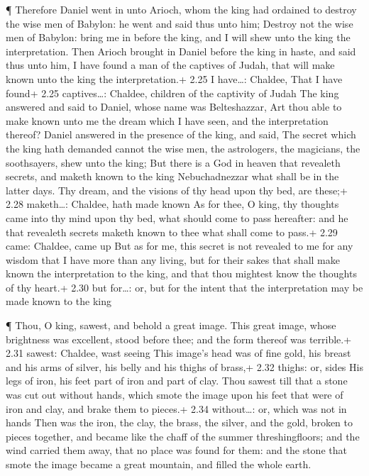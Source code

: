  ¶ Therefore Daniel went in unto Arioch, whom the king had
ordained to destroy the wise men of Babylon: he went and said thus unto
him; Destroy not the wise men of Babylon: bring me in before the king,
and I will shew unto the king the interpretation.  Then
Arioch brought in Daniel before the king in haste, and said thus unto
him, I have found a man of the captives of Judah, that will make known
unto the king the interpretation.+ 2.25 I have\ldots: Chaldee, That I
have found+ 2.25 captives\ldots: Chaldee, children of the captivity of
Judah  The king answered and said to Daniel, whose name was
Belteshazzar, Art thou able to make known unto me the dream which I have
seen, and the interpretation thereof?  Daniel answered in
the presence of the king, and said, The secret which the king hath
demanded cannot the wise men, the astrologers, the magicians, the
soothsayers, shew unto the king;  But there is a God in
heaven that revealeth secrets, and maketh known to the king
Nebuchadnezzar what shall be in the latter days. Thy dream, and the
visions of thy head upon thy bed, are these;+ 2.28 maketh\ldots:
Chaldee, hath made known  As for thee, O king, thy thoughts
came into thy mind upon thy bed, what should come to pass hereafter: and
he that revealeth secrets maketh known to thee what shall come to pass.+
2.29 came: Chaldee, came up  But as for me, this secret is
not revealed to me for any wisdom that I have more than any living, but
for their sakes that shall make known the interpretation to the king,
and that thou mightest know the thoughts of thy heart.+ 2.30 but
for\ldots: or, but for the intent that the interpretation may be made
known to the king

 ¶ Thou, O king, sawest, and behold a great image. This
great image, whose brightness was excellent, stood before thee; and the
form thereof was terrible.+ 2.31 sawest: Chaldee, wast seeing
 This image's head was of fine gold, his breast and his
arms of silver, his belly and his thighs of brass,+ 2.32 thighs: or,
sides  His legs of iron, his feet part of iron and part of
clay.  Thou sawest till that a stone was cut out without
hands, which smote the image upon his feet that were of iron and clay,
and brake them to pieces.+ 2.34 without\ldots: or, which was not in
hands  Then was the iron, the clay, the brass, the silver,
and the gold, broken to pieces together, and became like the chaff of
the summer threshingfloors; and the wind carried them away, that no
place was found for them: and the stone that smote the image became a
great mountain, and filled the whole earth.

